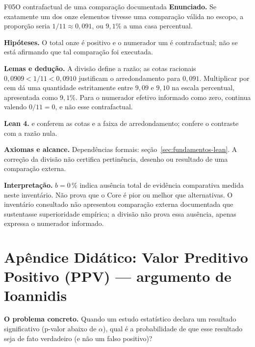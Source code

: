 \begin{formalizacao}{F05}{O contrafactual de uma comparação documentada}
\textbf{Enunciado.} Se exatamente um dos onze elementos tivesse uma comparação válida no escopo, a proporção seria $1/11\approx0{,}091$, ou $9{,}1\%$ a uma casa percentual.

\textbf{Hipóteses.} O total onze é positivo e o numerador um é contrafactual; não se está afirmando que tal comparação foi executada.

\textbf{Lemas e dedução.} A divisão define a razão; as cotas racionais $0{,}0909<1/11<0{,}0910$ justificam o arredondamento para $0{,}091$. Multiplicar por cem dá uma quantidade estritamente entre $9{,}09$ e $9{,}10$ na escala percentual, apresentada como $9{,}1\%$. Para o numerador efetivo informado como zero, continua valendo $0/11=0$, e não esse contrafactual.

\textbf{Lean 4.}  e  conferem as cotas e a faixa de arredondamento;  confere o contraste com a razão nula.

\textbf{Axiomas e alcance.} Dependências formais: seção~\ref{sec:fundamentos-lean}. A correção da divisão não certifica pertinência, desenho ou resultado de uma comparação externa.
\end{formalizacao}

\begin{descricao}
\textbf{Interpretação.} $b = 0\,\%$ indica ausência total de evidência comparativa medida neste inventário. Não prova que o Core é pior ou melhor que alternativas. O inventário consultado não apresentou comparação externa documentada que sustentasse superioridade empírica; a divisão não prova essa ausência, apenas expressa o numerador informado.
\end{descricao}

\clearpage
\section{Apêndice Didático: Valor Preditivo Positivo (PPV) — argumento de Ioannidis}


\begin{descricao}
\textbf{O problema concreto.} Quando um estudo estatístico declara um resultado significativo (p-valor abaixo de $\alpha$), qual é a probabilidade de que esse resultado seja de fato verdadeiro (e não um falso positivo)?
\end{descricao}

